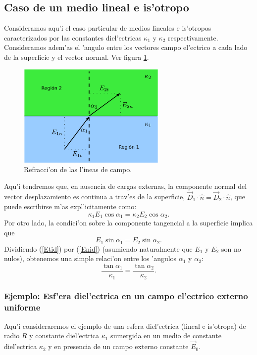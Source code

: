\subsection{Caso de un medio lineal e is'otropo}

Consideramos aqu'i el caso particular de medios lineales e is'otropos caracterizados por las constantes diel'ectricas $\kappa_1$ y $\kappa_2$ respectivamente. Consideramos adem'as el 'angulo entre los vectores campo el'ectrico a cada lado de la superficie y el vector normal. Ver figura \ref{CF3}. 
\begin{figure}[!h]
\centerline{\includegraphics[height=5cm]{fig/fig-dielectrico-condicion-borde-03.pdf}}
\caption{Refracci'on de las l'ineas de campo.}
\label{CF3}
\end{figure}
Aqu'i tendremos que, en ausencia de cargas externas, la componente normal del vector desplazamiento es continua a trav'es de la superficie,  $\vec{D}_1\cdot\hat{n}=\vec{D}_2\cdot\hat{n}$, que puede escribirse m'as expl'icitamente como:
\begin{equation}\label{Enid}
\kappa_1 E_1\cos\alpha_1=\kappa_2E_2\cos\alpha_2.
\end{equation}
Por otro lado, la condici'on sobre la componente tangencial a la superficie implica que
\begin{equation} \label{Etid}
 E_1\sin\alpha_1=E_2\sin\alpha_2.
\end{equation}
Dividiendo (\ref{Etid}) por (\ref{Enid}) (asumiendo naturalmente que $E_1$ y $E_2$ son no nulos), obtenemos una simple relaci'on entre los 'angulos $\alpha_1$ y $\alpha_2$:
\begin{equation}
 \frac{\tan\alpha_1}{\kappa_1}=\frac{\tan\alpha_2}{\kappa_2}.
\end{equation}

\subsubsection{Ejemplo: Esf'era diel'ectrica en un campo el'ectrico externo uniforme}
Aqu'i consideraremos el ejemplo de una esfera diel'ectrica (lineal e is'otropa) de radio $R$ y constante diel'ectrica $\kappa_1$ sumergida en un medio de constante diel'ectrica $\kappa_2$ y en presencia de un campo externo constante $\vec{E}_0$.

